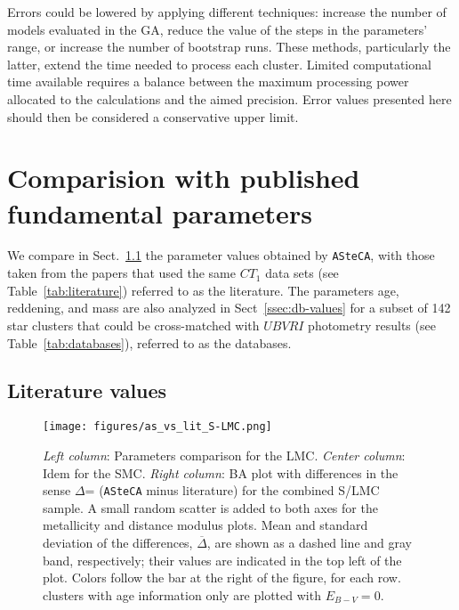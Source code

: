 \documentclass{aa}
\begin{document}
Errors could be lowered by applying different techniques: increase the
number of models evaluated in the GA, reduce the value of the steps in the
parameters' range, or increase the number of bootstrap runs.
%
These methods, particularly the latter, extend the time needed to process
each cluster. Limited computational time available requires a balance between
the maximum processing power allocated to the calculations and the aimed
precision. Error values presented here should then be considered a conservative
upper limit.





\section{Comparision with published fundamental parameters}
\label{sec:comp-pub-data}

We compare in Sect.~\ref{ssec:lit-values} the parameter values obtained by
\texttt{ASteCA}, with those taken from the papers that used the same
$CT_1$ data sets (see Table~\ref{tab:literature}) referred to as the
literature.
%
The parameters age, reddening, and mass are also analyzed in
Sect~\ref{ssec:db-values} for a subset of 142 star clusters that could be
cross-matched with $UBVRI$ photometry results (see Table~\ref{tab:databases}),
referred to as the databases.

  

\subsection{Literature values}
\label{ssec:lit-values}

\begin{figure*}
\texttt{[image: figures/as\_vs\_lit\_S-LMC.png]}
\caption{\emph{Left column}: Parameters comparison for the LMC.\@
\emph{Center column}: Idem for the SMC.\@
\emph{Right column}: BA plot with differences in the sense $\Delta$= (\texttt
{ASteCA} minus literature) for the combined S/LMC sample.
A small random scatter is added to both axes for the metallicity and distance
modulus plots. Mean and standard deviation of the differences,
$\overline{\Delta}$, are shown as a dashed line and gray band, respectively;
their values are indicated in the top left of the plot.
Colors follow the bar at the right of the figure, for each row.~\cite
{Piatti_2011b} clusters with age information only are plotted
with $E_{B-V}{=}0$.}
\label{fig:as_vs_lit}
\end{figure*}
\end{document}
